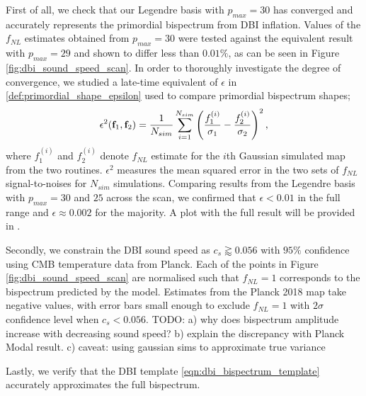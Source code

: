 First of all, we check that our Legendre basis with $p_{max}=30$ has converged and accurately represents the primordial bispectrum from DBI inflation. Values of the $f_{NL}$ estimates obtained from $p_{max}=30$ were tested against the equivalent result with $p_{max}=29$ and shown to differ less than $0.01\%$, as can be seen in Figure \ref{fig:dbi_sound_speed_scan}. In order to thoroughly investigate the degree of convergence, we studied a late-time equivalent of $\epsilon$ in  \eqref{def:primordial_shape_epsilon} used to compare primordial bispectrum shapes;
\begin{align}
	\epsilon^2 (\mathbf{f}_1, \mathbf{f}_2) = \frac{1}{N_{sim}}  \sum_{i=1}^{N_{sim}} \left( \frac{f^{(i)}_1}{\sigma_1} - \frac{f^{(i)}_2}{\sigma_2} \right)^2,
\end{align}
where $f^{(i)}_1$ and $f^{(i)}_2$ denote $f_{NL}$ estimate for the $i$th Gaussian simulated map from the two routines. $\epsilon^2$ measures the mean squared error in the two sets of $f_{NL}$ signal-to-noises for $N_{sim}$ simulations. Comparing results from the Legendre basis with $p_{max} = 30$ and $25$ across the scan, we confirmed that $\epsilon < 0.01$ in the full range and $\epsilon \approx 0.002$ for the majority. A plot with the full result will be provided in \cite{Sohn2021inprep}.

Secondly, we constrain the DBI sound speed as $c_s \gtrapprox 0.056$ with $95\%$ confidence using CMB temperature data from Planck. Each of the points in Figure \ref{fig:dbi_sound_speed_scan} are normalised such that $f_{NL}=1$ corresponds to the bispectrum predicted by the model. Estimates from the Planck 2018 map take negative values, with error bars small enough to exclude $f_{NL}=1$ with $2\sigma$ confidence level when $c_s < 0.056$. TODO:  a) why does bispectrum amplitude increase with decreasing sound speed? b) explain the discrepancy with Planck Modal result. c) caveat: using gaussian sims to approximate true variance

Lastly, we verify that the DBI template \eqref{eqn:dbi_bispectrum_template} accurately approximates the full bispectrum. 

